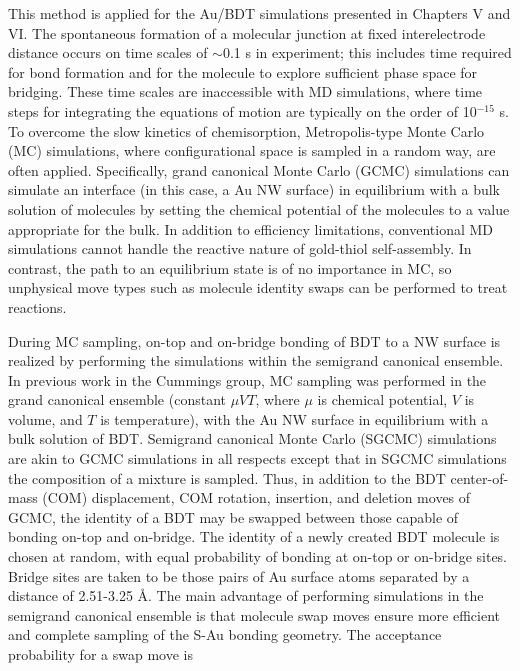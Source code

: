 \documentclass[10pt]{report}  %
\newcommand\findent{\hspace*{\parindent}}
\begin{document}
\findent This method is applied for the Au/BDT simulations presented in Chapters V and VI. The spontaneous formation of a molecular junction at fixed interelectrode distance occurs on time scales of $\sim$0.1 s in experiment; \cite{Haiss:2008} this includes time required for bond formation and for the molecule to explore sufficient phase space for bridging.  These time scales are inaccessible with MD simulations, where time steps for integrating the equations of motion are typically on the order of 10$^{-15}$ s. To overcome the slow kinetics of chemisorption, Metropolis-type \cite{Metropolis:1953} Monte Carlo (MC) simulations, where configurational space is sampled in a random way, are often applied. Specifically, grand canonical Monte Carlo (GCMC)  simulations can simulate an interface (in this case, a Au NW surface) in equilibrium with a bulk solution of molecules by setting the chemical potential of the molecules to a value appropriate for the bulk. \cite{Zhao:2006} In addition to efficiency limitations, conventional MD simulations cannot handle the reactive nature of gold-thiol self-assembly.  In contrast, the path to an equilibrium state is of no importance in MC, so unphysical move types such as molecule identity swaps can be performed to treat reactions. \cite{Frenkel:2002}

During MC sampling, on-top and on-bridge bonding of BDT to a NW surface is realized by performing the simulations within the semigrand canonical ensemble.\cite{Kofke:1988}  In previous work in the Cummings group, \cite{Zhao:2006,Pu:2007,Pu:2010} MC sampling was performed in the grand canonical ensemble (constant $\mu$$VT$, where $\mu$ is chemical potential, $V$ is volume, and $T$ is temperature), with the Au NW surface in equilibrium with a bulk solution of BDT.  Semigrand canonical Monte Carlo (SGCMC)  simulations are akin to GCMC simulations in all respects except that in SGCMC simulations the composition of a mixture is sampled.  Thus, in addition to the BDT center-of-mass (COM) displacement, COM rotation, insertion, and deletion moves of GCMC, the identity of a BDT may be swapped between those capable of bonding on-top and on-bridge.  The identity of a newly created BDT molecule is chosen at random, with equal probability of bonding at on-top or on-bridge sites.  Bridge sites are taken to be those pairs of Au surface atoms separated by a distance of 2.51-3.25 \AA. The main advantage of performing simulations in the semigrand canonical ensemble is that molecule swap moves ensure more efficient and complete sampling of the S-Au bonding geometry.  The acceptance probability for a swap move is 
\end{document}
